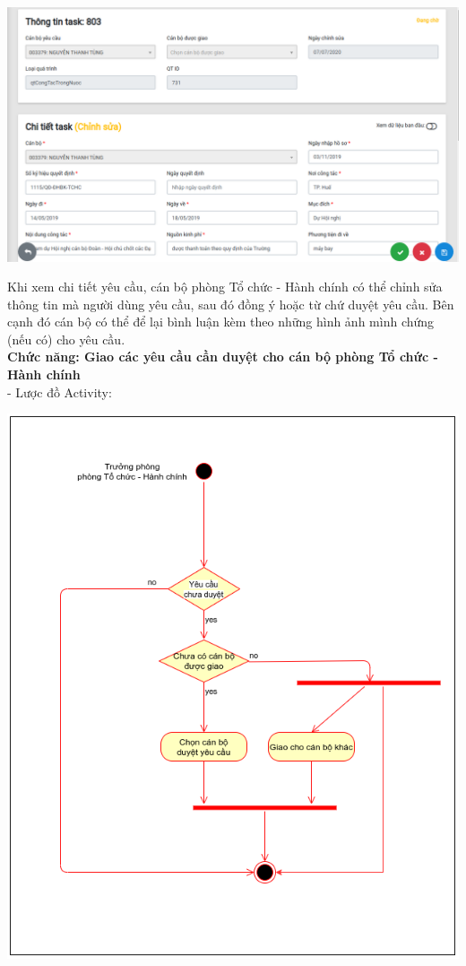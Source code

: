 \begin{center}
  \captionsetup{type=figure}
  \includegraphics[scale=0.5]{img/Screen/chitiettask.png}
\end{center}
Khi xem chi tiết yêu cầu, cán bộ phòng Tổ chức - Hành chính có thể chỉnh sửa thông tin mà người dùng yêu cầu, sau đó đồng ý hoặc từ chứ duyệt yêu cầu. Bên cạnh đó cán bộ có thể để lại bình luận kèm theo những hình ảnh mình chứng (nếu có) cho yêu cầu.\\
\textbf{Chức năng: Giao các yêu cầu cần duyệt cho cán bộ phòng Tổ chức - Hành chính}\\
- Lược đồ Activity:
\begin{center}
  \captionsetup{type=figure}
  \includegraphics[scale=0.6]{img/UML/Manager/assignTask.png}
\end{center}

